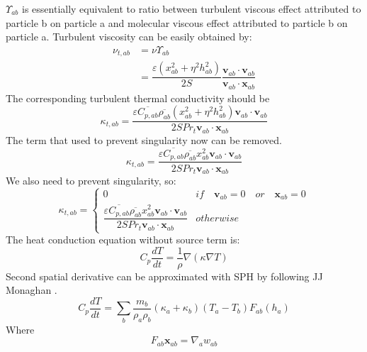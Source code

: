 \documentclass[10pt,a4paper]{article}
\begin{document}
$\Upsilon_{ab}$ is essentially equivalent to ratio between turbulent viscous effect attributed to particle b on particle a and molecular viscous effect attributed to particle b on particle a. Turbulent viscosity can be easily obtained by:
\begin{equation}
\begin{split}
\nu_{t,ab} &= \nu \Upsilon_{ab} \\
&= \dfrac{\varepsilon (x_{ab}^2 + \eta^2 h_{ab}^2)}{2 S} \dfrac{\textbf{v}_{ab} \cdot \textbf{v}_{ab}}{\textbf{v}_{ab} \cdot \textbf{x}_{ab}}
\end{split}
\end{equation}
The corresponding turbulent thermal conductivity should be
\begin{equation}
\kappa_{t,ab}=\dfrac{\varepsilon \overline{C_{p,ab}} \overline{\rho_{ab}} (x_{ab}^2 + \eta^2 h_{ab}^2) \textbf{v}_{ab} \cdot \textbf{v}_{ab}}{2 S Pr_t\textbf{v}_{ab} \cdot \textbf{x}_{ab}}
\end{equation}
The term that used to prevent singularity now can be removed. 
\begin{equation}
\kappa_{t,ab}=\dfrac{\varepsilon \overline{C_{p,ab}} \overline{\rho_{ab}} x_{ab}^2 \textbf{v}_{ab} \cdot \textbf{v}_{ab}}{2 S Pr_t\textbf{v}_{ab} \cdot \textbf{x}_{ab} }
\end{equation}
We also need to prevent singularity, so: 
\begin{equation}
\kappa_{t,ab}= 
\begin{cases} 
      0 & if  \quad \textbf{v}_{ab}=0 \quad or \quad \textbf{x}_{ab}=0 \\
      \dfrac{\varepsilon \overline{C_{p,ab}} \overline{\rho_{ab}} x_{ab}^2 \textbf{v}_{ab} \cdot \textbf{v}_{ab}}{2 S Pr_t\textbf{v}_{ab} \cdot \textbf{x}_{ab} } & other wise
\end{cases}
\end{equation}
The heat conduction equation without source term is:
\begin{equation}
C_p \dfrac{dT}{dt} = \dfrac{1}{\rho} \nabla (\kappa \nabla T)
\end{equation}
Second spatial derivative can be approximated with SPH by following JJ Monaghan \citep{monaghan2005smoothed}. 
\begin{equation}
C_p \dfrac{dT}{dt} = \sum_b \dfrac{m_b}{\rho_a \rho_b} (\kappa_a + \kappa_b) (T_a - T_b) F_{ab} (h_a)
\end{equation}
Where
\begin{equation}
F_{ab} \textbf{x}_{ab} = \nabla _a w_{ab}
\end{equation}
\end{document}
